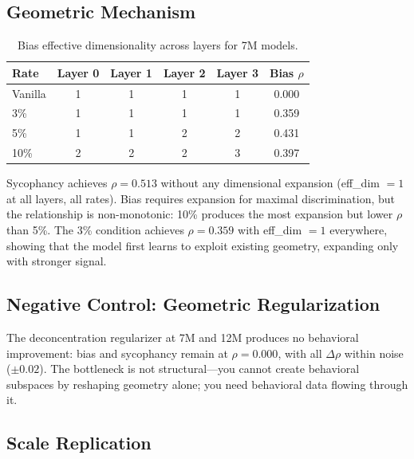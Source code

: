 \documentclass[11pt]{article}
\begin{document}
\subsection{Geometric Mechanism}

\begin{table}[t]
\centering
\caption{Bias effective dimensionality across layers for 7M models.}
\label{tab:effdim}
\begin{tabular}{lccccc}
\toprule
Rate & Layer 0 & Layer 1 & Layer 2 & Layer 3 & Bias $\rho$ \\
\midrule
Vanilla & 1 & 1 & 1 & 1 & 0.000 \\
3\%     & 1 & 1 & 1 & 1 & 0.359 \\
5\%     & 1 & 1 & 2 & 2 & 0.431 \\
10\%    & 2 & 2 & 2 & 3 & 0.397 \\
\bottomrule
\end{tabular}
\end{table}

Sycophancy achieves $\rho = 0.513$ without any dimensional expansion (eff\_dim $= 1$ at all layers, all rates). Bias requires expansion for maximal discrimination, but the relationship is non-monotonic: 10\% produces the most expansion but lower $\rho$ than 5\%. The 3\% condition achieves $\rho = 0.359$ with eff\_dim $= 1$ everywhere, showing that the model first learns to exploit existing geometry, expanding only with stronger signal.

\subsection{Negative Control: Geometric Regularization}

The deconcentration regularizer at 7M and 12M produces no behavioral improvement: bias and sycophancy remain at $\rho = 0.000$, with all $\Delta\rho$ within noise ($\pm 0.02$). The bottleneck is not structural---you cannot create behavioral subspaces by reshaping geometry alone; you need behavioral data flowing through it.

\subsection{Scale Replication}
\end{document}
